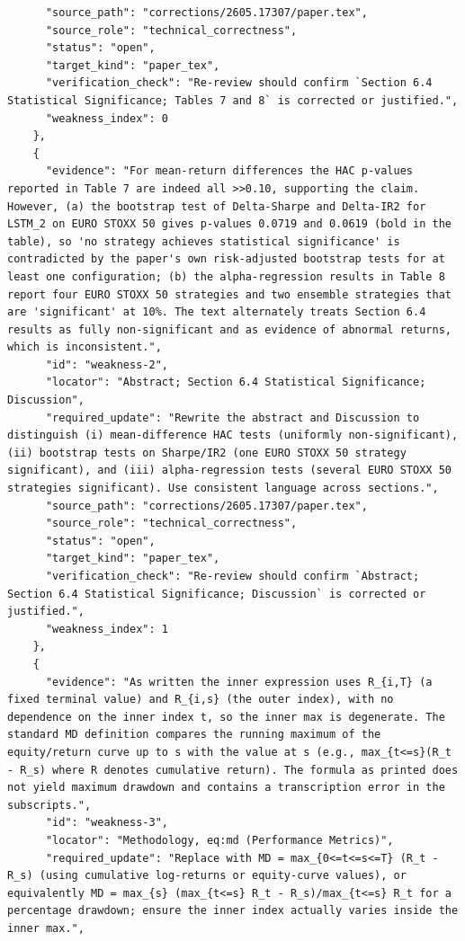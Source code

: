 \documentclass[11pt]{article}
\begin{document}
\begin{verbatim}
      "source_path": "corrections/2605.17307/paper.tex",
      "source_role": "technical_correctness",
      "status": "open",
      "target_kind": "paper_tex",
      "verification_check": "Re-review should confirm `Section 6.4 Statistical Significance; Tables 7 and 8` is corrected or justified.",
      "weakness_index": 0
    },
    {
      "evidence": "For mean-return differences the HAC p-values reported in Table 7 are indeed all >>0.10, supporting the claim. However, (a) the bootstrap test of Delta-Sharpe and Delta-IR2 for LSTM_2 on EURO STOXX 50 gives p-values 0.0719 and 0.0619 (bold in the table), so 'no strategy achieves statistical significance' is contradicted by the paper's own risk-adjusted bootstrap tests for at least one configuration; (b) the alpha-regression results in Table 8 report four EURO STOXX 50 strategies and two ensemble strategies that are 'significant' at 10%. The text alternately treats Section 6.4 results as fully non-significant and as evidence of abnormal returns, which is inconsistent.",
      "id": "weakness-2",
      "locator": "Abstract; Section 6.4 Statistical Significance; Discussion",
      "required_update": "Rewrite the abstract and Discussion to distinguish (i) mean-difference HAC tests (uniformly non-significant), (ii) bootstrap tests on Sharpe/IR2 (one EURO STOXX 50 strategy significant), and (iii) alpha-regression tests (several EURO STOXX 50 strategies significant). Use consistent language across sections.",
      "source_path": "corrections/2605.17307/paper.tex",
      "source_role": "technical_correctness",
      "status": "open",
      "target_kind": "paper_tex",
      "verification_check": "Re-review should confirm `Abstract; Section 6.4 Statistical Significance; Discussion` is corrected or justified.",
      "weakness_index": 1
    },
    {
      "evidence": "As written the inner expression uses R_{i,T} (a fixed terminal value) and R_{i,s} (the outer index), with no dependence on the inner index t, so the inner max is degenerate. The standard MD definition compares the running maximum of the equity/return curve up to s with the value at s (e.g., max_{t<=s}(R_t - R_s) where R denotes cumulative return). The formula as printed does not yield maximum drawdown and contains a transcription error in the subscripts.",
      "id": "weakness-3",
      "locator": "Methodology, eq:md (Performance Metrics)",
      "required_update": "Replace with MD = max_{0<=t<=s<=T} (R_t - R_s) (using cumulative log-returns or equity-curve values), or equivalently MD = max_{s} (max_{t<=s} R_t - R_s)/max_{t<=s} R_t for a percentage drawdown; ensure the inner index actually varies inside the inner max.",

\end{verbatim}
\end{document}
